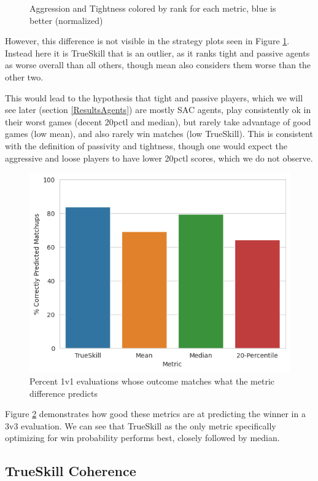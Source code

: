 \begin{figure}[H]
{}
\caption{Aggression and Tightness colored by rank for each metric, blue is better (normalized)}
\label{AggTightRank}
\end{figure}

However, this difference is not visible in the strategy plots seen in Figure \ref{AggTightRank}. Instead here it is TrueSkill that is an outlier, as it ranks tight and passive agents as worse overall than all others, though mean also considers them worse than the other two.

This would lead to the hypothesis that tight and passive players, which we will see later (section \ref{ResultsAgents}) are mostly SAC agents, play consistently ok in their worst games (decent 20pctl and median), but rarely take advantage of good games (low mean), and also rarely win matches (low TrueSkill). This is consistent with the definition of passivity and tightness, though one would expect the aggressive and loose players to have lower 20pctl scores, which we do not observe.


\begin{figure}[H]
\centering
    \includegraphics[width=0.8\linewidth]{Results/figures/upsets_per_metric.png}
\caption{Percent 1v1 evaluations whose outcome matches what the metric difference predicts}
\label{UpsetsPlot}
\end{figure}

Figure \ref{UpsetsPlot} demonstrates how good these metrics are at predicting the winner in a 3v3 evaluation. We can see that TrueSkill as the only metric specifically optimizing for win probability performs best, closely followed by median.


\subsection{TrueSkill Coherence}

